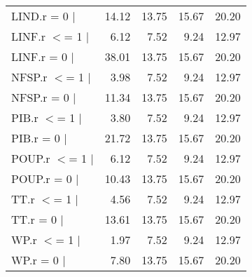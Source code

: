 \begin{table}[!htb]
\begin{tabular}{lrrrr}
  LIND.r = 0  $|$ & 14.12 & 13.75 & 15.67 & 20.20 \\ 
  LINF.r $<$= 1 $|$ & 6.12 & 7.52 & 9.24 & 12.97 \\ 
  LINF.r = 0  $|$ & 38.01 & 13.75 & 15.67 & 20.20 \\ 
  NFSP.r $<$= 1 $|$ & 3.98 & 7.52 & 9.24 & 12.97 \\ 
  NFSP.r = 0  $|$ & 11.34 & 13.75 & 15.67 & 20.20 \\ 
  PIB.r $<$= 1 $|$ & 3.80 & 7.52 & 9.24 & 12.97 \\ 
  PIB.r = 0  $|$ & 21.72 & 13.75 & 15.67 & 20.20 \\ 
  POUP.r $<$= 1 $|$ & 6.12 & 7.52 & 9.24 & 12.97 \\ 
  POUP.r = 0  $|$ & 10.43 & 13.75 & 15.67 & 20.20 \\ 
  TT.r $<$= 1 $|$ & 4.56 & 7.52 & 9.24 & 12.97 \\ 
  TT.r = 0  $|$ & 13.61 & 13.75 & 15.67 & 20.20 \\ 
  WP.r $<$= 1 $|$ & 1.97 & 7.52 & 9.24 & 12.97 \\ 
  WP.r = 0  $|$ & 7.80 & 13.75 & 15.67 & 20.20 \\ 
   \bottomrule
\end{tabular}
\end{table}

